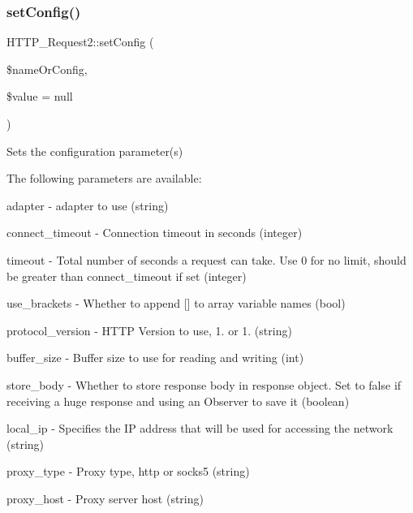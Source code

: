 \subsubsection{\texorpdfstring{set\+Config()}{setConfig()}}
{\footnotesize\ttfamily H\+T\+T\+P\+\_\+\+Request2\+::set\+Config (\begin{DoxyParamCaption}\item[{}]{\$name\+Or\+Config,  }\item[{}]{\$value = {\ttfamily null} }\end{DoxyParamCaption})}

Sets the configuration parameter(s)

The following parameters are available\+: 
\begin{DoxyItemize}
\item \textquotesingle{}adapter\textquotesingle{} -\/ adapter to use (string) 
\item \textquotesingle{}connect\+\_\+timeout\textquotesingle{} -\/ Connection timeout in seconds (integer) 
\item \textquotesingle{}timeout\textquotesingle{} -\/ Total number of seconds a request can take. Use 0 for no limit, should be greater than \textquotesingle{}connect\+\_\+timeout\textquotesingle{} if set (integer) 
\item \textquotesingle{}use\+\_\+brackets\textquotesingle{} -\/ Whether to append \mbox{[}\mbox{]} to array variable names (bool) 
\item \textquotesingle{}protocol\+\_\+version\textquotesingle{} -\/ H\+T\+TP Version to use, \textquotesingle{}1.\textquotesingle{} or \textquotesingle{}1.\textquotesingle{} (string) 
\item \textquotesingle{}buffer\+\_\+size\textquotesingle{} -\/ Buffer size to use for reading and writing (int) 
\item \textquotesingle{}store\+\_\+body\textquotesingle{} -\/ Whether to store response body in response object. Set to false if receiving a huge response and using an Observer to save it (boolean) 
\item \textquotesingle{}local\+\_\+ip\textquotesingle{} -\/ Specifies the IP address that will be used for accessing the network (string) 
\item \textquotesingle{}proxy\+\_\+type\textquotesingle{} -\/ Proxy type, \textquotesingle{}http\textquotesingle{} or \textquotesingle{}socks5\textquotesingle{} (string) 
\item \textquotesingle{}proxy\+\_\+host\textquotesingle{} -\/ Proxy server host (string) 

\end{DoxyItemize}

